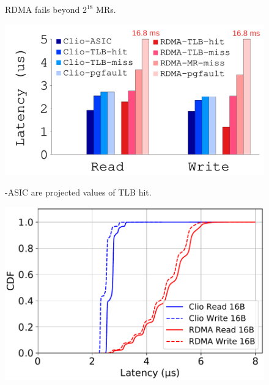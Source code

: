 {\begin{figure}[th]
\begin{minipage}{\figWidthSix}
\begin{center}
{
RDMA fails beyond $2^{18}$ MRs. 
}
\end{center}
\end{minipage}
\begin{minipage}{\figWidthSix}
\begin{center}
\centerline{\includegraphics[width=\columnwidth]{Figures/g_plot_latency_comparison.pdf}}
\vspace{-0.1in}
\captionsetup{width=.9\columnwidth}
{
\sys-ASIC are projected values of TLB hit.
}
\end{center}
\end{minipage}
\begin{minipage}{\figWidthSix}
\begin{center}
\centerline{\includegraphics[width=\columnwidth]{Figures/clio_rdma_lat_cdf.pdf}}
\vspace{-0.1in}
\captionsetup{width=.9\columnwidth}
{
}
\end{center}
\end{minipage}
\vspace{-0.1in}
\end{figure}
}
